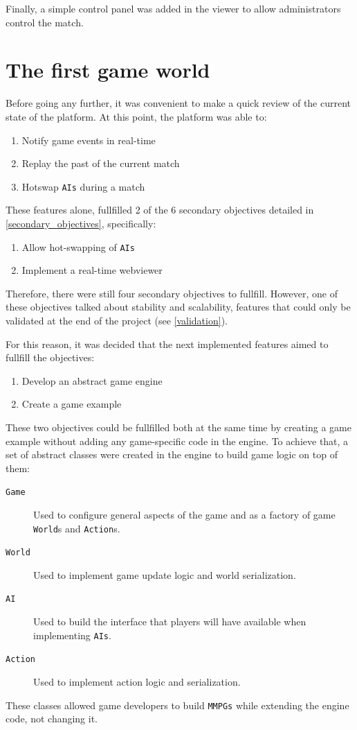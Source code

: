 \documentclass[a4paper,11pt,titlepage,abstract,numbers=noenddot,automark,mnsy,intlimits,rgb,dvipsnames]{report}
\begin{document}
Finally, a simple control panel was added in the viewer to allow administrators control the match.
\chapter{The first game world}
\label{first_game_world}
Before going any further, it was convenient to make a quick review of the current state of the platform. At this point,
the platform was able to:
\begin{enumerate}
\item
Notify game events in real-time
\item
Replay the past of the current match
\item
Hotswap \texttt{AIs} during a match
\end{enumerate}
These features alone, fullfilled 2 of the 6 secondary objectives detailed in \autoref{secondary_objectives},
specifically:
\begin{enumerate}
\item
Allow hot-swapping of \texttt{AIs}
\item
Implement a real-time webviewer
\end{enumerate}
Therefore, there were still four secondary objectives to fullfill. However, one of these objectives talked about
stability and scalability, features that could only be validated at the end of the project (see \autoref{validation}).

For this reason, it was decided that the next implemented features aimed to fullfill the objectives:
\begin{enumerate}
\item
Develop an abstract game engine
\item
Create a game example
\end{enumerate}
These two objectives could be fullfilled both at the same time by creating a game example without adding any game-specific
code in the engine. To achieve that, a set of abstract classes were created in the engine to build game logic on top of them:
\begin{description}
\item[\texttt{Game}]
Used to configure general aspects of the game and as a factory of game \texttt{World}s and \texttt{Action}s.
\item[\texttt{World}]
Used to implement game update logic and world serialization.
\item[\texttt{AI}]
Used to build the interface that players will have available when implementing \texttt{AIs}.
\item[\texttt{Action}]
Used to implement action logic and serialization.
\end{description}
These classes allowed game developers to build \texttt{MMPGs} while extending the engine code, not changing it.
\end{document}

